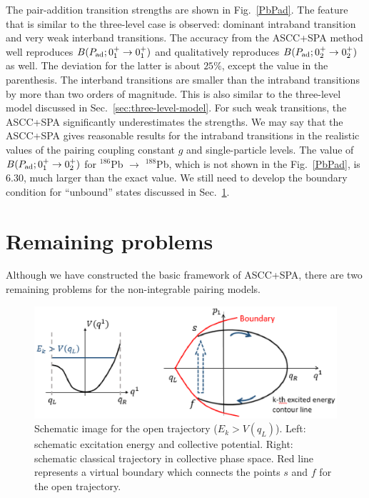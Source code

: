\documentclass[11pt]{book} %
\begin{document}
The pair-addition transition strengths are shown in Fig.~\ref{PbPad}.
The feature that is similar to the three-level case is observed:
dominant intraband transition and very weak interband transitions.
The accuracy from the ASCC+SPA method well reproduces
$B(P_{\rm ad};0_1^+\rightarrow 0_1^+)$
and qualitatively reproduces
$B(P_{\rm ad};0_2^+\rightarrow 0_2^+)$ as well.
The deviation for the latter is about $25\%$, except the value in the parenthesis.
The interband transitions are smaller than the intraband transitions
by more than two orders of magnitude.
This is also similar to the three-level model discussed
in Sec.~\ref{sec:three-level-model}.
For such weak transitions, the ASCC+SPA significantly
underestimates the strengths.
We may say that the ASCC+SPA gives reasonable results for the intraband
transitions in the realistic values of the pairing coupling constant $g$ and
single-particle levels. The value of $B(P_{\rm ad};0_1^+\rightarrow 0_2^+)$ for ${}^{186}$Pb $\to$ ${}^{188}$Pb, which is not shown in the Fig.~\ref{PbPad}, is $6.30$, much larger than the exact value. We still need to develop the boundary condition for ``unbound'' states discussed in Sec.~\ref{4-4}. 


\section{Remaining problems}
\label{4-4}
Although we have constructed the basic framework of ASCC+SPA, there are two remaining problems for the non-integrable pairing models.

\begin{figure}[htbp]
 \begin{center}
  \includegraphics[width=140mm]{images/open_traj.eps}
 \end{center}
 \caption{Schematic image for the open trajectory ($E_k > V(q_L)$). Left: schematic excitation energy and collective potential. Right: schematic classical trajectory in collective phase space. Red line represents a virtual boundary which connects the points $s$ and $f$ for the open trajectory.}
 \label{open-traj}
\end{figure}
\end{document}
